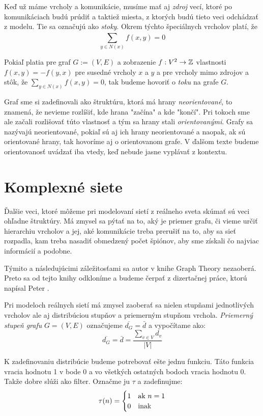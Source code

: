 Keď už máme vrcholy a komunikácie, musíme mať aj \emph{zdroj} vecí, ktoré po 
komunikáciach budú prúdiť a taktiež miesta, z ktorých budú tieto veci odchádzať 
z modelu. Tie sa označujú ako \emph{stoky}. Okrem týchto špeciálnych vrcholov 
platí, že $$\sum_{y\in N(x)}^{}{f(x,y) = 0}$$

Pokiaľ platia pre graf $G := (V, E)$ a zobrazenie $f:V^2\rightarrow\mathbb{Z}$ 
vlastnosti $f(x,y) = -f(y,x)$ pre susedné vrcholy $x$ a $y$ a pre vrcholy mimo 
zdrojov a stôk, že $\sum_{y\in N(x)}^{}{f(x,y) = 0}$, tak budeme hovoriť o 
\emph{toku} na grafe $G$.

Graf sme si zadefinovali ako štruktúru, ktorá má hrany \emph{neorientované}, 
to znamená, že nevieme rozlíšiť, kde hrana "začína" a kde "končí". Pri tokoch 
sme ale začali rozlišovať túto vlastnosť a tým sa hrany stali 
\emph{orientovanými}. Grafy sa nazývajú neorientované, pokiaľ sú aj ich hrany 
neorientované a naopak, ak sú orientované hrany, tak hovoríme aj o 
orientovanom grafe. V ďalšom texte budeme orientovanosť uvádzať iba vtedy, keď 
nebude jasne vyplávať z kontextu.

\section{Komplexné siete}

Ďalšie veci, ktoré môžeme pri modelovaní sietí z reálneho sveta skúmať sú 
veci ohľadne štruktúry. Má zmysel sa pýtať na to, aký je priemer grafu, či vieme 
určiť hierarchiu vrcholov a jej, aké komunikácie treba prerušiť na to, aby 
sa sieť rozpadla, kam treba nasadiť obmedzený počet špiónov, aby sme získali čo 
najviac informácií a podobne.

Týmito a následujúcimi záležitosťami sa autor v knihe Graph Theory nezaoberá. 
Preto sa od tejto knihy odkloníme a budeme čerpať z dizertačnej práce, ktorú 
napísal Peter \citet{nather}.

Pri modeloch reálnych sietí má zmysel zaoberať sa nielen stupňami jednotlivých 
vrcholov ale aj distribúciou stupňov a priemerným stupňom vrchola. 
\emph{Priemerný stupeň grafu} $G = (V, E)$ označujeme $\overline{d_G} = \bar{d}$ a 
vypočítame ako: $$\overline{d_G} = \bar{d} = \frac{\sum_{v \in V}^{}{d_v}}{|V|}$$

K zadefinovaniu distribúcie budeme potrebovať ešte jednu funkciu. Táto funkcia 
vracia hodnotu 1 v bode 0 a vo všetkých ostatných bodoch vracia hodnotu 0. 
Takže dobre slúži ako filter. Označme ju $\tau$ a zadefinujme: 
$$\tau (n) = \begin{cases}
\hfill 1 \hfill & \text{ak $n=1$} \\
\hfill 0 \hfill & \text{inak} \\
\end{cases}$$

